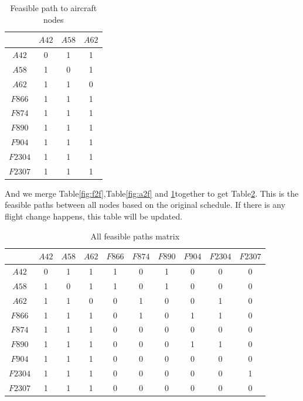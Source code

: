 \documentclass[senior]{IPSstyle}
\begin{document}
\begin{table}[h]
\renewcommand{\arraystretch}{1}

\begin{center}
\begin{tabular}{|c|c|c|c|}
\hline
\multicolumn{1}{|c|}{}
&\multicolumn{1}{|c|}{\(A42\)}
&\multicolumn{1}{c|}{\(A58\)}
&\multicolumn{1}{c|}{\(A62\)}
\\  \hline
\(A42\) & 0 & 1 & 1
\\	\hline
\(A58\) & 1 & 0 & 1
\\	\hline
\(A62\) & 1 & 1 & 0 
\\  \hline
\(F866\) & 1 & 1 & 1
\\	\hline
\(F874\) & 1 & 1 & 1
\\	\hline
\(F890\) & 1 & 1 & 1
\\  \hline
\(F904\) & 1 & 1 & 1
\\  \hline
\(F2304\) & 1 & 1 & 1
\\  \hline
\(F2307\) & 1 & 1 & 1
\\  \hline
\end{tabular}
\caption{Feasible path to aircraft nodes}
\label{a2a & f2a}
\end{center}
\end{table}

And we merge Table\ref{fig:f2f},Table\ref{fig:a2f} and \ref{a2a & f2a}together to get Table\ref{all paths}.
This is the feasible paths between all nodes based on the original schedule. If there is any flight change happens, this table will be updated.

\begin{table}[h]
\renewcommand{\arraystretch}{1}
\begin{center}
\begin{tabular}{|c|c|c|c|c|c|c|c|c|c|}
\hline
\multicolumn{1}{|c|}{}
&\multicolumn{1}{|c|}{\(A42\)}
&\multicolumn{1}{c|}{\(A58\)}
&\multicolumn{1}{c|}{\(A62\)}
&\multicolumn{1}{|c|}{\(F866\)}
&\multicolumn{1}{c|}{\(F874\)}
&\multicolumn{1}{c|}{\(F890\)}
&\multicolumn{1}{c|}{\(F904\)}
&\multicolumn{1}{c|}{\(F2304\)}
&\multicolumn{1}{c|}{\(F2307\)}
\\  \hline
\(A42\) & 0 & 1 & 1 & 1 & 0 & 1 & 0 & 0 & 0
\\	\hline
\(A58\) & 1 & 0 & 1 & 1 & 0 & 1 & 0 & 0 & 0
\\	\hline
\(A62\) & 1 & 1 & 0 & 0 & 1 & 0 & 0 & 1 & 0
\\  \hline
\(F866\) & 1 & 1 & 1 & 0 & 1 & 0 & 1 & 1 & 0
\\	\hline
\(F874\) & 1 & 1 & 1 & 0 & 0 & 0 & 0 & 0 & 0
\\	\hline
\(F890\) & 1 & 1 & 1 & 0 & 0 & 0 & 1 & 1 & 0
\\  \hline
\(F904\) & 1 & 1 & 1 & 0 & 0 & 0 & 0 & 0 & 0
\\  \hline
\(F2304\) & 1 & 1 & 1 & 0 & 0 & 0 & 0 & 0 & 1
\\  \hline
\(F2307\) & 1 & 1 & 1 & 0 & 0 & 0 & 0 & 0 & 0
\\  \hline
\end{tabular}
\caption{All feasible paths matrix}
\label{all paths}
\end{center}
\end{table}
\end{document}
